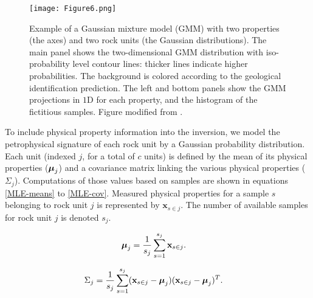 \documentclass[paper, twocolumn]{geophysics} %
\newcommand{\mitbf}[1]{
  \hbox{\mathversion{bold}$#1$}}
\begin{document}
\begin{figure}[!ht]
\centering
\texttt{[image: Figure6.png]}
\caption{Example of a Gaussian mixture model (GMM) with two properties (the axes) and two rock units (the Gaussian distributions). The main panel shows the two-dimensional GMM distribution with iso-probability level contour lines: thicker lines indicate higher probabilities. The background is colored according to the geological identification prediction. The left and bottom panels show the GMM projections in $1$D for each property, and the histogram of the fictitious samples. Figure modified from \citet{AsticJoint}.}
\label{fig:Figure6.png}
\end{figure}

To include physical property information into the inversion, we model the petrophysical signature of each rock unit by a Gaussian probability distribution. Each unit (indexed $j$, for a total of $c$ units) is defined by the mean of its physical properties ($\mitbf{\mu}_j$) and a covariance matrix linking the various physical properties ($\Sigma_j$). Computations of those values based on samples are shown in equations \ref{MLE-means} to \ref{MLE-cov}. Measured physical properties for a sample $s$ belonging to rock unit $j$ is represented by $\mathbf{x}_{s \in j}$. The number of available samples for rock unit $j$ is denoted $s_j$.



\begin{align}
\mitbf{\mu}_j &= \frac{1}{s_j}\sum_{s=1}^{s_j}\mathbf{x}_{s \in j}.
\label{MLE-means}
\end{align}

\begin{align}
\Sigma_j & = \frac{1}{s_j}\sum_{s=1}^{s_j}(\mathbf{x}_{s \in j}-\mitbf{\mu}_j)(\mathbf{x}_{s \in j}-\mitbf{\mu}_j)^T.
\label{MLE-cov}
\end{align}
\end{document}
